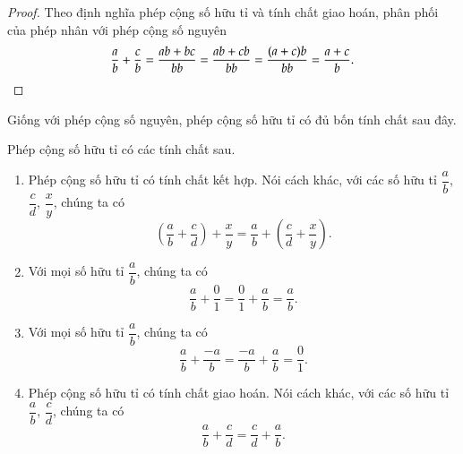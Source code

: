 \begin{proof}
    Theo định nghĩa phép cộng số hữu tỉ và tính chất giao hoán, phân phối của phép nhân với phép cộng số nguyên
    \[
        \frac{a}{b} + \frac{c}{b} = \frac{ab + bc}{bb} = \frac{ab + cb}{bb} = \frac{(a + c)b}{bb} = \frac{a + c}{b}.\qedhere
    \]
\end{proof}

Giống với phép cộng số nguyên, phép cộng số hữu tỉ có đủ bốn tính chất sau đây.
\begin{theorem}\label{theorem:property-of-rational-numbers-addition}
    Phép cộng số hữu tỉ có các tính chất sau.
    \begin{enumerate}[label={(\roman*)}]
        \item Phép cộng số hữu tỉ có tính chất kết hợp. Nói cách khác, với các số hữu tỉ $\dfrac{a}{b}$, $\dfrac{c}{d}$, $\dfrac{x}{y}$, chúng ta có
              \[
                  \left(\frac{a}{b} + \frac{c}{d}\right) + \frac{x}{y} = \frac{a}{b} + \left(\frac{c}{d} + \frac{x}{y}\right).
              \]
        \item Với mọi số hữu tỉ $\dfrac{a}{b}$, chúng ta có
              \[
                  \frac{a}{b} + \frac{0}{1} = \frac{0}{1} + \frac{a}{b} = \frac{a}{b}.
              \]
        \item Với mọi số hữu tỉ $\dfrac{a}{b}$, chúng ta có
              \[
                  \frac{a}{b} + \frac{-a}{b} = \frac{-a}{b} + \frac{a}{b} = \frac{0}{1}.
              \]
        \item Phép cộng số hữu tỉ có tính chất giao hoán. Nói cách khác, với các số hữu tỉ $\dfrac{a}{b}$, $\dfrac{c}{d}$, chúng ta có
              \[
                  \frac{a}{b} + \frac{c}{d} = \frac{c}{d} + \frac{a}{b}.
              \]
    \end{enumerate}
\end{theorem}


